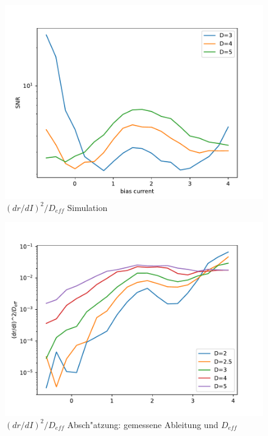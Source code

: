 \documentclass[12pt,a4paper]{article}
\begin{document}
\begin{figure}[H]
	\centering
	\includegraphics[scale=0.9]{snr345log.pdf}
	\caption{$(dr/dI)^2/D_{eff}$ Simulation}
	\label{snrsim}
\end{figure}
\begin{figure}[H]
	\centering
	\includegraphics[scale=0.9]{snrapp29m5.pdf}
	\caption{$(dr/dI)^2/D_{eff}$ Absch"atzung: gemessene Ableitung und $D_{eff}$}
	\label{snrapp}
\end{figure}
\end{document}
